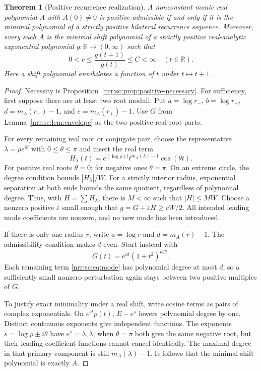 \documentclass[11pt,letterpaper]{article}
\newtheorem{theorem}{Theorem}[section]
\theoremstyle{definition}
\theoremstyle{remark}
\newcommand{\R}{\mathbb R}
\begin{document}
\begin{theorem}[Positive recurrence realization]
\label{nrr:sc:thm:positive-realization}
A nonconstant monic real polynomial $A$ with $A(0)\ne0$ is
positive-admissible if and only if it is the minimal polynomial of a
strictly positive bilateral recurrence sequence. Moreover, every such
$A$ is the minimal shift polynomial of a strictly positive real-analytic
exponential polynomial $g:\R\to(0,\infty)$ such that
\begin{equation}
 0<c\le\frac{g(t+1)}{g(t)}\le C<\infty\quad(t\in\R).
 \label{nrr:sc:eq:ratio}
\end{equation}
Here a shift polynomial annihilates a function of $t$ under $t\mapsto t+1$.
\end{theorem}
\begin{proof}
Necessity is Proposition~\ref{nrr:sc:prop:positive-necessary}.
For sufficiency, first suppose there are at least two root moduli.
Put $a=\log r_-$, $b=\log r_+$,
$d=m_A(r_-)-1$, and $e=m_A(r_+)-1$.
Use $G$ from Lemma~\ref{nrr:sc:lem:envelope} as the two positive-real-root
parts.

For every remaining real root or conjugate pair, choose the representative
$\lambda=\rho e^{i\theta}$ with $0\le\theta\le\pi$ and insert the real term
\begin{equation}
 H_\lambda(t)=e^{(\log\rho)t}t^{m_A(\lambda)-1}\cos(\theta t).
 \label{nrr:sc:eq:mode}
\end{equation}
For positive real roots $\theta=0$; for negative ones $\theta=\pi$.
On an extreme circle, the degree condition bounds $|H_\lambda|/W$.
For a strictly interior radius, exponential separation at both ends
bounds the same quotient, regardless of polynomial degree.
Thus, with $H=\sum H_\lambda$, there is $M<\infty$ such that $|H|\le MW$.
Choose a nonzero positive $\varepsilon$ small enough that
$g=G+\varepsilon H\ge cW/2$.
All intended leading mode coefficients are nonzero, and no new mode
has been introduced.

If there is only one radius $r$, write $a=\log r$ and
$d=m_A(r)-1$. The admissibility condition makes $d$ even. Start instead
with
\[
 G(t)=e^{at}(1+t^2)^{d/2}.
\]
Each remaining term \eqref{nrr:sc:eq:mode} has polynomial degree at most $d$,
so a sufficiently small nonzero perturbation again stays between two
positive multiples of $G$.

To justify exact minimality under a real shift, write cosine terms as
pairs of complex exponentials. On $e^{st}p(t)$, $E-e^s$ lowers polynomial
degree by one. Distinct continuous exponents give independent functions.
The exponents $s=\log\rho\pm i\theta$ have $e^s=\lambda,\overline\lambda$;
when $\theta=\pi$ both give the same negative root, but their leading
coefficient functions cannot cancel identically. The maximal degree
in that primary component is still $m_A(\lambda)-1$.
It follows that the minimal shift polynomial is exactly $A$.


\end{proof}
\end{document}
